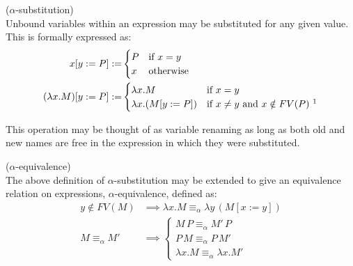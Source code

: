\documentclass{article}
\begin{document}
        \begin{definition}{($\alpha$-substitution)\\}\label{lambda-alpha-relation}
            Unbound variables within an expression may be substituted for any given value.
            This is formally expressed as:
            \begin{align}
                x[y := P] := &
                    \begin{cases}
                        P & \text{if } x = y \\
                        x & \text{otherwise}
                    \end{cases} \\
                (\lambda x . M)[y := P] := &
                    \begin{cases}
                        \lambda x . M & \text{if } x = y \\
                        \lambda x . (M[y := P]) & \text{if } x \neq y \text{ and } x \notin FV(P)~\footnotemark
                    \end{cases}
            \end{align}
        \end{definition}
        This operation may be thought of as variable renaming as long as both old and new names are free in the expression in which they were substituted.

        \begin{corollary*}{($\alpha$-equivalence)\\}
            The above definition of $\alpha$-substitution may be extended to give an equivalence relation on expressions, $\alpha$-equivalence, defined as:
            \begin{align}
                y \notin FV(M) & \implies \lambda x . M \equiv_\alpha \lambda y \, (M[x := y]) \\
                M \equiv_\alpha M' & \implies
                    \begin{cases}
                        M \, P \equiv_\alpha M' \, P \\
                        P \, M \equiv_\alpha P \, M' \\
                        \lambda x . M \equiv_\alpha \lambda x. M'
                    \end{cases}
            \end{align}
        \end{corollary*}
\end{document}
